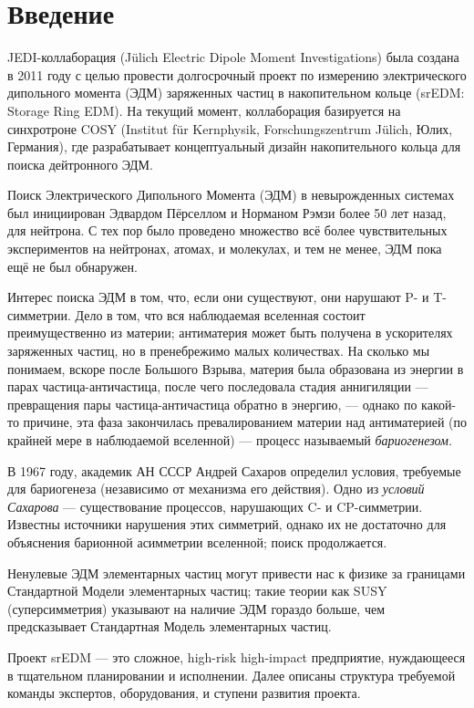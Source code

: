 \documentclass{extarticle}
\begin{document}


\tableofcontents
\pagebreak

\section*{Введение}
JEDI-коллаборация (J\"ulich Electric Dipole Moment Investigations) была создана в 2011 году с целью провести долгосрочный проект по измерению электрического дипольного момента (ЭДМ) заряженных частиц в накопительном кольце (srEDM: Storage Ring EDM). На текущий момент, коллаборация базируется на синхротроне COSY (Institut f\"ur Kernphysik, Forschungszentrum J\"ulich, Юлих, Германия), где разрабатывает концептуальный дизайн накопительного кольца для поиска дейтронного ЭДМ.

Поиск Электрического Дипольного Момента (ЭДМ) в невырожденных системах был инициирован Эдвардом Пёрселлом и Норманом Рэмзи более 50 лет назад, для нейтрона. С тех пор было проведено множество всё более чувствительных экспериментов на нейтронах, атомах, и молекулах, и тем не менее, ЭДМ пока ещё не был обнаружен. 

Интерес поиска ЭДМ в том, что, если они существуют, они нарушают P- и T-симметрии. Дело в том, что вся наблюдаемая вселенная состоит преимущественно из материи; антиматерия может быть получена в ускорителях заряженных частиц, но в пренебрежимо малых количествах. На сколько мы понимаем, вскоре после Большого Взрыва, материя была образована из энергии в парах частица-античастица, после чего последовала стадия аннигиляции --- превращения пары частица-античастица обратно в энергию, --- однако по какой-то причине, эта фаза закончилась превалированием материи над антиматерией (по крайней мере в наблюдаемой вселенной) --- процесс называемый \emph{бариогенезом.}

В 1967 году, академик АН СССР Андрей Сахаров определил условия, требуемые для бариогенеза (независимо от механизма его действия). Одно из \emph{условий Сахарова} --- существование процессов, нарушающих C- и CP-симметрии. Известны источники нарушения этих симметрий, однако их не достаточно для объяснения барионной асимметрии вселенной; поиск продолжается.

Ненулевые ЭДМ элементарных частиц могут привести нас к физике за границами Стандартной Модели элементарных частиц; такие теории как SUSY (суперсимметрия) указывают на наличие ЭДМ гораздо больше, чем предсказывает Стандартная Модель элементарных частиц.

Проект srEDM --- это сложное, high-risk high-impact предприятие, нуждающееся в тщательном планировании и исполнении. Далее описаны структура требуемой команды экспертов, оборудования, и ступени развития проекта.
\end{document}
